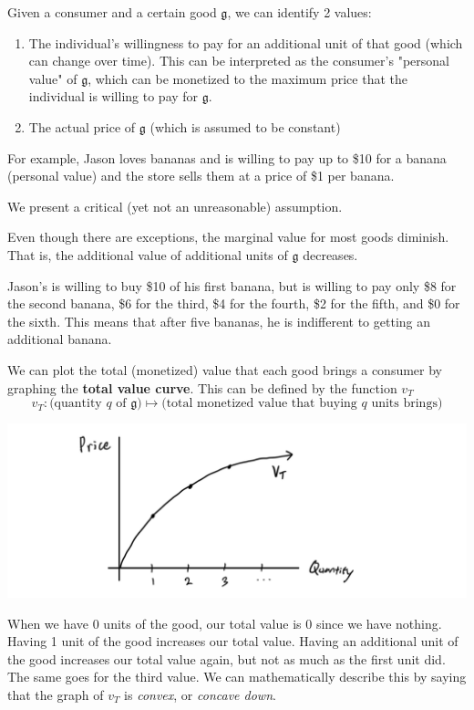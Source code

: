 \documentclass{article}
\begin{document}
    Given a consumer and a certain good $\mathfrak{g}$, we can identify 2 values: 
    \begin{enumerate}
      \item The individual's willingness to pay for an additional unit of that good (which can change over time). This can be interpreted as the consumer's "personal value" of $\mathfrak{g}$, which can be monetized to the maximum price that the individual is willing to pay for $\mathfrak{g}$. 
      \item The actual price of $\mathfrak{g}$ (which is assumed to be constant)
    \end{enumerate}
    For example, Jason loves bananas and is willing to pay up to \$10 for a banana (personal value) and the store sells them at a price of \$1 per banana. 

    We present a critical (yet not an unreasonable) assumption. 

    \begin{definition}
      Even though there are exceptions, the marginal value for most goods diminish. That is, the additional value of additional units of $\mathfrak{g}$ decreases. 
    \end{definition}

    \begin{example}
      Jason's is willing to buy \$10 of his first banana, but is willing to pay only \$8 for the second banana, \$6 for the third, \$4 for the fourth, \$2 for the fifth, and \$0 for the sixth. This means that after five bananas, he is indifferent to getting an additional banana. 
    \end{example}

    \begin{definition}
      We can plot the total (monetized) value that each good brings a consumer by graphing the \textbf{total value curve}. This can be defined by the function $v_T$
      \[v_T: \big( \text{quantity } q \text{ of } \mathfrak{g}\big) \mapsto \big(\text{total monetized value that buying } q \text{ units brings} \big)\]
      \begin{center}
          \includegraphics[scale=0.25]{img/Total_Value_Curve.PNG}
      \end{center}
      When we have 0 units of the good, our total value is 0 since we have nothing. Having 1 unit of the good increases our total value. Having an additional unit of the good increases our total value again, but not as much as the first unit did. The same goes for the third value. We can mathematically describe this by saying that the graph of $v_T$ is \textit{convex}, or \textit{concave down}. 
    \end{definition}
\end{document}
